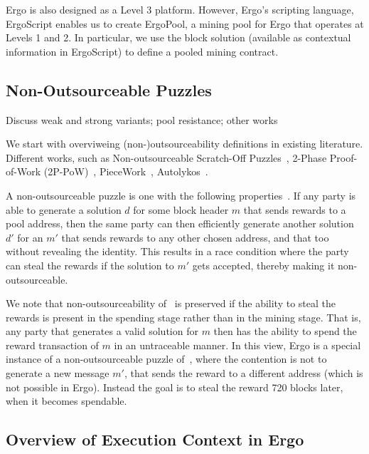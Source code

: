 \documentclass[11pt]{article}
\newcommand{\authnote}[2]{\marginpar{\parbox{\marginparwidth}{\tiny %
  \textsf{#1 {\textcolor{blue}{notes: #2}}}}}%
  \textcolor{blue}{\textbf{\dag}}}
\newcommand{\authnote}[2]{
  \textsf{#1 \textcolor{blue}{: #2}}}
\newcommand{\authnote}[2]{}
\newcommand{\snote}[1]{{\authnote{\textcolor{yellow}{Scalahub notes}}{#1}}}
\newcommand{\langname}{ErgoScript\xspace}
\newcommand{\poolname}{ErgoPool\xspace}
\begin{document}
Ergo is also designed as a Level 3 platform. However, Ergo's scripting language, \langname enables us to create \poolname, a mining pool for Ergo that operates at Levels 1 and 2. In particular, we use the block solution (available as contextual information in \langname) to define a pooled mining contract.

\subsection{Non-Outsourceable Puzzles}

Discuss weak and strong variants; pool resistance; other works

We start with overviweing (non-)outsourceability definitions in existing literature. Different works, such as
Non-outsourceable Scratch-Off Puzzles~\cite{miller2015nonoutsourceable},  2-Phase Proof-of-Work (2P-PoW)~\cite{twophase},
PieceWork~\cite{daian2017short}, Autolykos~\cite{autolykos}.



\snote{Following is copied from PoW intro paper}

A non-outsourceable puzzle is one with the following properties~\cite{miller2015nonoutsourceable}. If any party is able to generate a solution $d$ for some block header $m$ that sends rewards to a pool address, then the same party can then efficiently generate another solution $d'$ for an $m'$ that sends rewards to any other chosen address, and that too without revealing the identity. This results in a race condition where the party can steal the rewards if the solution to $m'$ gets accepted, thereby making it non-outsourceable. 

We note that non-outsourceability of~\cite{miller2015nonoutsourceable} is preserved if the ability to steal the rewards is present in the spending stage rather than in the mining stage. That is, any party that generates a valid solution for $m$ then has the ability to spend the reward transaction of $m$ in an untraceable manner. 
In this view, Ergo is a special instance of a non-outsourceable puzzle of~\cite{miller2015nonoutsourceable}, where the contention is not to generate a new message $m'$, that sends the reward to a different address (which is not possible in Ergo). Instead the goal is to steal the reward 720 blocks later, when it becomes spendable. 

\subsection{Overview of Execution Context in Ergo}
\end{document}
